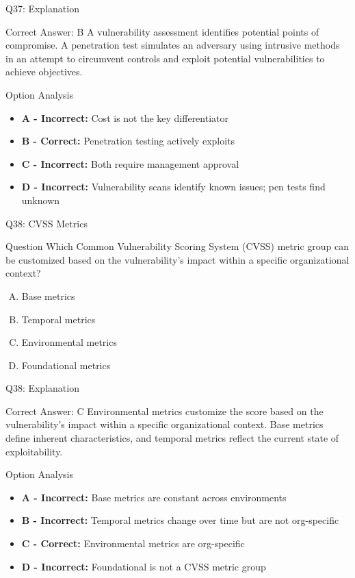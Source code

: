 \documentclass{beamer}
\begin{document}
	\begin{frame}{Q37: Explanation}
		\begin{block}{Correct Answer: B}
			A vulnerability assessment identifies potential points of compromise. A penetration test simulates an adversary using intrusive methods in an attempt to circumvent controls and exploit potential vulnerabilities to achieve objectives.
		\end{block}
		\begin{block}{Option Analysis}
			\begin{itemize}
				\item \textbf{A - Incorrect:} Cost is not the key differentiator
				\item \textbf{B - Correct:} Penetration testing actively exploits
				\item \textbf{C - Incorrect:} Both require management approval
				\item \textbf{D - Incorrect:} Vulnerability scans identify known issues; pen tests find unknown
			\end{itemize}
		\end{block}
	\end{frame}
	
	\begin{frame}{Q38: CVSS Metrics}
		\begin{block}{Question}
			Which Common Vulnerability Scoring System (CVSS) metric group can be customized based on the vulnerability's impact within a specific organizational context?
		\end{block}
		\begin{enumerate}[(A)]
			\item Base metrics
			\item Temporal metrics
			\item Environmental metrics
			\item Foundational metrics
		\end{enumerate}
	\end{frame}
	
	\begin{frame}{Q38: Explanation}
		\begin{block}{Correct Answer: C}
			Environmental metrics customize the score based on the vulnerability's impact within a specific organizational context. Base metrics define inherent characteristics, and temporal metrics reflect the current state of exploitability.
		\end{block}
		\begin{block}{Option Analysis}
			\begin{itemize}
				\item \textbf{A - Incorrect:} Base metrics are constant across environments
				\item \textbf{B - Incorrect:} Temporal metrics change over time but are not org-specific
				\item \textbf{C - Correct:} Environmental metrics are org-specific
				\item \textbf{D - Incorrect:} Foundational is not a CVSS metric group
			\end{itemize}
		\end{block}
	\end{frame}
	
\end{document}
